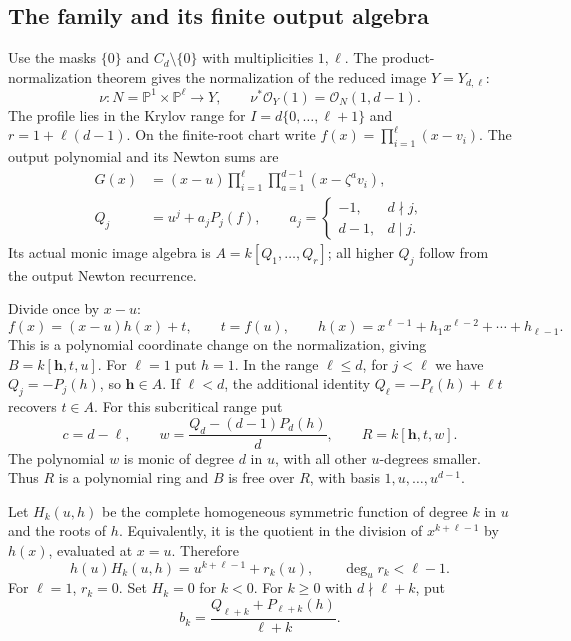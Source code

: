 \documentclass[10pt,fleqn]{article}
\numberwithin{equation}{section}
\newcommand{\PP}{\mathbb P}
\begin{document}
\subsection{The family and its finite output algebra}
\label{r22:mixed:finite-output}

Use the masks $\{0\}$ and $C_d\setminus\{0\}$ with multiplicities
$1,\ell$.  The product-normalization theorem
\cite[Theorem~5.4]{LiProfileGeometry} gives the normalization of the
reduced image $Y=Y_{d,\ell}$:
\[
 \nu:N=\PP^1\times\PP^\ell\longrightarrow Y,
 \qquad\nu^*\mathcal O_Y(1)=\mathcal O_N(1,d-1).
\]
The profile lies in the Krylov range for
$I=d\{0,\ldots,\ell+1\}$ and $r=1+\ell(d-1)$.
On the finite-root chart write $f(x)=\prod_{i=1}^\ell(x-v_i)$.  The output
polynomial and its Newton sums are
\begin{align}
 G(x)&=(x-u)\prod_{i=1}^\ell\prod_{a=1}^{d-1}(x-\zeta^a v_i),
 \label{v7:mixed:output}\\
 Q_j&=u^j+a_jP_j(f),\qquad
 a_j=\begin{cases}-1,&d\nmid j,\\d-1,&d\mid j.\end{cases}
 \label{v7:mixed:newton}
\end{align}
Its actual monic image algebra is $A=k[Q_1,\ldots,Q_r]$;
all higher $Q_j$ follow from the output Newton recurrence.

Divide once by $x-u$:
\begin{equation}\label{v7:mixed:division}
 f(x)=(x-u)h(x)+t,\qquad t=f(u),\qquad
 h(x)=x^{\ell-1}+h_1x^{\ell-2}+\cdots+h_{\ell-1}.
\end{equation}
This is a polynomial coordinate change on the normalization, giving
$B=k[\mathbf h,t,u]$.  For $\ell=1$ put $h=1$.
In the range $\ell\le d$, for $j<\ell$ we have $Q_j=-P_j(h)$, so $\mathbf h\in A$.
If $\ell<d$, the additional identity
$Q_\ell=-P_\ell(h)+\ell t$ recovers $t\in A$.
For this subcritical range put
\begin{equation}\label{v7:mixed:noether-ring}
 c=d-\ell,\qquad
 w=\frac{Q_d-(d-1)P_d(h)}d,\qquad R=k[\mathbf h,t,w].
\end{equation}
The polynomial $w$ is monic of degree $d$ in $u$, with all other
$u$-degrees smaller.  Thus $R$ is a polynomial ring and
$B$ is free over $R$, with basis $1,u,\ldots,u^{d-1}$.

Let $H_k(u,h)$ be the complete homogeneous symmetric function of degree
$k$ in $u$ and the roots of $h$.  Equivalently, it is the quotient in the
division of $x^{k+\ell-1}$ by $h(x)$, evaluated at $x=u$.  Therefore
\begin{equation}\label{v7:mixed:division-remainder}
 h(u)H_k(u,h)=u^{k+\ell-1}+r_k(u),\qquad\deg_u r_k<\ell-1.
\end{equation}
For $\ell=1$, $r_k=0$.  Set $H_k=0$ for $k<0$.
For $k\ge0$ with $d\nmid\ell+k$, put
\begin{equation}\label{v7:mixed:bk}
 b_k=\frac{Q_{\ell+k}+P_{\ell+k}(h)}{\ell+k}.
\end{equation}
\end{document}
